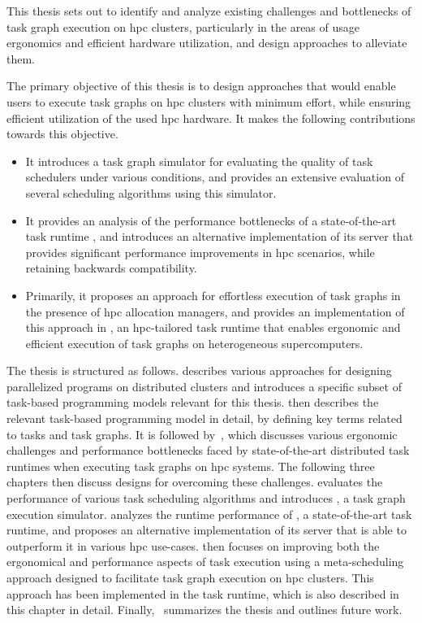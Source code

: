 This thesis sets out to identify and analyze existing challenges and bottlenecks of task graph
execution on \gls{hpc} clusters, particularly in the areas of usage ergonomics and
efficient hardware utilization, and design approaches to alleviate them.

The primary objective of this thesis is to design approaches that would enable users to execute
task graphs on \gls{hpc} clusters with minimum effort, while ensuring efficient
utilization of the used \gls{hpc} hardware. It makes the following contributions
towards this objective.

\begin{itemize}
	\item It introduces a task graph simulator for evaluating the quality of task schedulers under various
	      conditions, and provides an extensive evaluation of several scheduling algorithms using this
	      simulator.
	\item It provides an analysis of the performance bottlenecks of a state-of-the-art task runtime
	      \dask{}, and introduces an alternative implementation of its server that provides
	      significant performance improvements in \gls{hpc} scenarios, while retaining backwards
	      compatibility.
	\item Primarily, it proposes an approach for effortless execution of task graphs in the presence of
	      \gls{hpc} allocation managers, and provides an implementation of this approach in
	      \hyperqueue{}, an \gls{hpc}-tailored task runtime that enables ergonomic and
	      efficient execution of task graphs on heterogeneous supercomputers.
\end{itemize}

The thesis is structured as follows.  describes various approaches for
designing parallelized programs on distributed clusters and introduces a specific subset of
task-based programming models relevant for this thesis.  then describes the
relevant task-based programming model in detail, by defining key terms related to tasks and task
graphs. It is followed by~, which discusses various ergonomic challenges and
performance bottlenecks faced by state-of-the-art distributed task runtimes when executing task
graphs on \gls{hpc} systems. The following three chapters then discuss designs for
overcoming these challenges.  evaluates the performance of various task
scheduling algorithms and introduces \estee{}, a task graph execution simulator.
 analyzes the runtime performance of \dask{}, a
state-of-the-art task runtime, and proposes an alternative implementation of its server that is
able to outperform it in various \gls{hpc} use-cases.  then
focuses on improving both the ergonomical and performance aspects of task execution using a
meta-scheduling approach designed to facilitate task graph execution on \gls{hpc}
clusters. This approach has been implemented in the \hyperqueue{} task runtime, which is
also described in this chapter in detail. Finally,~ summarizes the thesis and
outlines future work.

